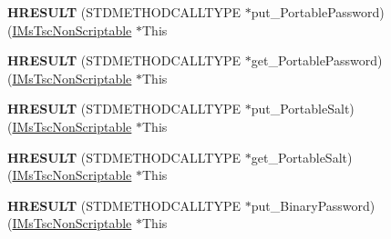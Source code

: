 \begin{DoxyCompactItemize}
\item 
\mbox{\label{struct_m_s_t_s_c_lib_1_1_i_ms_tsc_non_scriptable_vtbl_af30d8b11a69eb1deb4eafcfcf605d7e4}} 
{\bfseries H\+R\+E\+S\+U\+LT} (S\+T\+D\+M\+E\+T\+H\+O\+D\+C\+A\+L\+L\+T\+Y\+PE $\ast$put\+\_\+\+Portable\+Password)(\hyperlink{interface_m_s_t_s_c_lib_1_1_i_ms_tsc_non_scriptable}{I\+Ms\+Tsc\+Non\+Scriptable} $\ast$This
\item 
\mbox{\label{struct_m_s_t_s_c_lib_1_1_i_ms_tsc_non_scriptable_vtbl_a77e26b79b4b04e2cfa0555eebaee187c}} 
{\bfseries H\+R\+E\+S\+U\+LT} (S\+T\+D\+M\+E\+T\+H\+O\+D\+C\+A\+L\+L\+T\+Y\+PE $\ast$get\+\_\+\+Portable\+Password)(\hyperlink{interface_m_s_t_s_c_lib_1_1_i_ms_tsc_non_scriptable}{I\+Ms\+Tsc\+Non\+Scriptable} $\ast$This
\item 
\mbox{\label{struct_m_s_t_s_c_lib_1_1_i_ms_tsc_non_scriptable_vtbl_a8c9551f7b3e5adec410b78674b1a76de}} 
{\bfseries H\+R\+E\+S\+U\+LT} (S\+T\+D\+M\+E\+T\+H\+O\+D\+C\+A\+L\+L\+T\+Y\+PE $\ast$put\+\_\+\+Portable\+Salt)(\hyperlink{interface_m_s_t_s_c_lib_1_1_i_ms_tsc_non_scriptable}{I\+Ms\+Tsc\+Non\+Scriptable} $\ast$This
\item 
\mbox{\label{struct_m_s_t_s_c_lib_1_1_i_ms_tsc_non_scriptable_vtbl_ad157f1d56c1febc6572dd78abd118783}} 
{\bfseries H\+R\+E\+S\+U\+LT} (S\+T\+D\+M\+E\+T\+H\+O\+D\+C\+A\+L\+L\+T\+Y\+PE $\ast$get\+\_\+\+Portable\+Salt)(\hyperlink{interface_m_s_t_s_c_lib_1_1_i_ms_tsc_non_scriptable}{I\+Ms\+Tsc\+Non\+Scriptable} $\ast$This
\item 
\mbox{\label{struct_m_s_t_s_c_lib_1_1_i_ms_tsc_non_scriptable_vtbl_ac2d84052054427d021b9ca6e28aecf07}} 
{\bfseries H\+R\+E\+S\+U\+LT} (S\+T\+D\+M\+E\+T\+H\+O\+D\+C\+A\+L\+L\+T\+Y\+PE $\ast$put\+\_\+\+Binary\+Password)(\hyperlink{interface_m_s_t_s_c_lib_1_1_i_ms_tsc_non_scriptable}{I\+Ms\+Tsc\+Non\+Scriptable} $\ast$This
\item 
\mbox{\label{struct_m_s_t_s_c_lib_1_1_i_ms_tsc_non_scriptable_vtbl_af0cbc1defc2be0351ba19ebc58489f09}} 

\end{DoxyCompactItemize}
